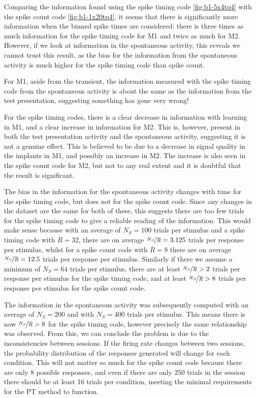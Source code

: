 Comparing the information found using the spike timing code \autoref{fig:b1-5x4tp4} with the spike count code \autoref{fig:b1-1x20tp4}, it seems that there is significantly more information when the binned spike times are considered: there is three times as much information for the spike timing code for \ac{M1} and twice as much for \ac{M2}.
However, if we look at information in the spontaneous activity, this reveals we cannot trust this result, as the bias for the information from the spontaneous activity is much higher for the spike timing code than spike count.

For \ac{M1}, aside from the transient, the information measured with the spike timing code from the spontaneous activity is about the same as the information from the test presentation, suggesting something has gone very wrong!

For the spike timing codes, there is a clear decrease in information with learning in \ac{M1}, and a clear increase in information for \ac{M2}.
This is, however, present in both the test presentation activity and the spontaneous activity, suggesting it is not a genuine effect.
This is believed to be due to a decrease in signal quality in the implants in \ac{M1}, and possibly an increase in \ac{M2}.
The increase is also seen in the spike count code for \ac{M2}, but not to any real extent and it is doubtful that the result is significant.

The bias in the information for the spontaneous activity changes with time for the spike timing code, but does not for the spike count code.
Since any changes in the dataset are the same for both of these, this suggests there are too few trials for the spike timing code to give a reliable reading of the information.
This would make sense because with an average of $N_S = 100$ trials per stimulus and a spike timing code with $\overline{R} = 32$, there are
on average $\nicefrac{N_S}{\overline{R}} = 3.125$ trials per response per stimulus,
whilst for a spike count code with $\overline{R} = 8$ there are on average $\nicefrac{N_S}{\overline{R}} = 12.5$ trials per response per stimulus.
Similarly if there we assume a minimum of $N_S = 64$ trials per stimulus, there are
at least $\nicefrac{N_S}{\overline{R}} > 2$ trials per response per stimulus for the spike timing code, and
at least $\nicefrac{N_S}{\overline{R}} > 8$ trials per response per stimulus for the spike count code.

The information in the spontaneous activity was subsequently computed with an average of $N_S = 200$ and with $N_S = 400$ trials per stimulus.
This means there is now $\nicefrac{N_S}{\overline{R}} > 8$ for the spike timing code, however precisely the same relationship was observed.
From this, we can conclude the problem is due to the inconsistencies between sessions.
If the firing rate changes between two sessions, the probability distribution of the responses generated will change for each condition.
This will not matter so much for the spike count code because there are only 8 possible responses, and even if there are only 250 trials in the session there should be at least 16 trials per condition, meeting the minimal requirements for the \ac{PT} method to function.

